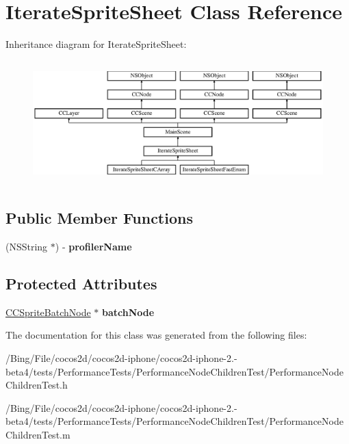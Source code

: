 \hypertarget{interface_iterate_sprite_sheet}{\section{Iterate\-Sprite\-Sheet Class Reference}
\label{interface_iterate_sprite_sheet}
}
Inheritance diagram for Iterate\-Sprite\-Sheet\-:\begin{figure}[H]
\begin{center}
\leavevmode
\includegraphics[height=4.800000cm]{interface_iterate_sprite_sheet}
\end{center}
\end{figure}
\subsection*{Public Member Functions}
\begin{DoxyCompactItemize}
\item 
\hypertarget{interface_iterate_sprite_sheet_ae7cbe0c281ad82ca282ca2861598acb6}{(N\-S\-String $\ast$) -\/ {\bfseries profiler\-Name}}\label{interface_iterate_sprite_sheet_ae7cbe0c281ad82ca282ca2861598acb6}

\end{DoxyCompactItemize}
\subsection*{Protected Attributes}
\begin{DoxyCompactItemize}
\item 
\hypertarget{interface_iterate_sprite_sheet_afb66368c108cbd0470f2848a57f25dfc}{\hyperlink{interface_c_c_sprite_batch_node}{C\-C\-Sprite\-Batch\-Node} $\ast$ {\bfseries batch\-Node}}\label{interface_iterate_sprite_sheet_afb66368c108cbd0470f2848a57f25dfc}

\end{DoxyCompactItemize}


The documentation for this class was generated from the following files\-:\begin{DoxyCompactItemize}
\item 
/\-Bing/\-File/cocos2d/cocos2d-\/iphone/cocos2d-\/iphone-\/2.-\/beta4/tests/\-Performance\-Tests/\-Performance\-Node\-Children\-Test/Performance\-Node\-Children\-Test.\-h\item 
/\-Bing/\-File/cocos2d/cocos2d-\/iphone/cocos2d-\/iphone-\/2.-\/beta4/tests/\-Performance\-Tests/\-Performance\-Node\-Children\-Test/Performance\-Node\-Children\-Test.\-m\end{DoxyCompactItemize}
